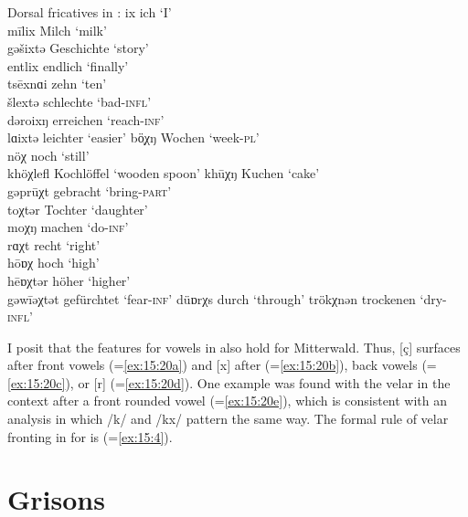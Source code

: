 {\ea%
\label{ex:15:20}Dorsal fricatives in :
\ea\label{ex:15:20a} ix  \tab  ich \tab ‘I’ \\
    mīlix \tab Milch \tab ‘milk’ \\
    gəšixtə \tab Geschichte \tab ‘story’ \\
    entlix \tab endlich \tab ‘finally’ \\
    tsēxnɑi \tab zehn \tab ‘ten’ \\
    šlextə \tab schlechte \tab ‘bad-\textsc{infl}’ \\
    dəroixŋ \tab erreichen \tab ‘reach-\textsc{inf}’ \\
    lɑixtə \tab leichter \tab ‘easier’ 
\ex\label{ex:15:20b} bö̹χŋ \tab Wochen \tab ‘week-\textsc{pl}’ \\
    nöχ  \tab  noch \tab ‘still’ \\
    khöχlefl \tab Kochlöffel \tab ‘wooden spoon’ 
\ex\label{ex:15:20c} khūχŋ \tab Kuchen \tab ‘cake’ \\
    gəprūχt \tab gebracht \tab ‘bring-\textsc{part}’ \\
    toχtər \tab Tochter \tab ‘daughter’ \\
    moχŋ \tab machen \tab ‘do-\textsc{inf}’ \\
    rɑχt  \tab  recht \tab ‘right’ \\
    hōɒχ \tab hoch \tab ‘high’ \\
    hēɒχtər \tab höher \tab ‘higher’ \\
    gəwīəχtət \tab gefürchtet \tab ‘fear-\textsc{inf}’ 
\ex\label{ex:15:20d} düɒrχs \tab durch \tab ‘through’ 
\ex\label{ex:15:20e} trökχnən \tab trockenen \tab ‘dry-\textsc{infl}’ 
\z
\z 

I posit that the features for vowels in  also hold for Mitterwald. Thus, [ç] surfaces after front vowels (=\ref{ex:15:20a}) and [x] after  (=\ref{ex:15:20b}), back vowels (=\ref{ex:15:20c}), or [r] (=\ref{ex:15:20d}). One example was found with the velar  in the context after a front rounded vowel (=\ref{ex:15:20e}), which is consistent with an analysis in which /k/ and /kx/ pattern the same way. The formal rule of velar fronting in  for  is  (=\ref{ex:15:4}).

\section{{Grisons}}\label{sec:15.6}

}
